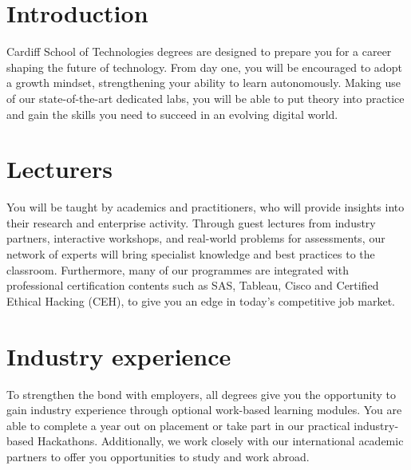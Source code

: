 \documentclass{article}
\begin{document}
\newpage %

\maketitle %

\tableofcontents

\section{Introduction}
Cardiff School of Technologies degrees are designed to prepare you for a
career shaping the future of technology. From day one, you will be
encouraged to adopt a growth mindset, strengthening your ability to learn
autonomously. Making use of our state-of-the-art dedicated labs, you will
be able to put theory into practice and gain the skills you need to succeed
in an evolving digital world. \cite{JenkinsAndAngel2006}

\section{Lecturers}
You will be taught by academics and practitioners, who will provide insights
into their research and enterprise activity. Through guest lectures from
industry partners, interactive workshops, and real-world problems for
assessments, our network of experts will bring specialist knowledge and best
practices to the classroom. Furthermore, many of our programmes are integrated
with professional certification contents such as SAS, Tableau, Cisco and
Certified Ethical Hacking (CEH), to give you an edge in today’s competitive job
market. \citep{JenkinsAndAngel2006}

\section{Industry experience}
To strengthen the bond with employers, all degrees give you the
opportunity to gain industry experience through optional work-based
learning modules. You are able to complete a year out on placement or take
part in our practical industry-based Hackathons. Additionally, we work
closely with our international academic partners to offer you
opportunities to study and work abroad.

 




\end{document}
